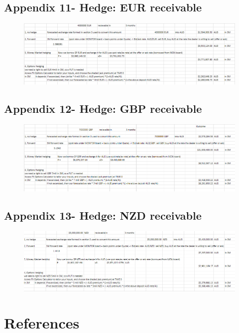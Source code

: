 \documentclass{article}
\let\Oldsubsection\subsection
\renewcommand{\subsection}{\FloatBarrier\Oldsubsection}
\begin{document}
\subsection*{Appendix 11- Hedge: EUR receivable}

\begin{figure}[h!]
    \centering
    \includegraphics[scale=0.5]{hedge/rec-EUR.png}
\end{figure}

\subsection*{Appendix 12- Hedge: GBP receivable}

\begin{figure}[h!]
    \centering
    \includegraphics[scale=0.5]{hedge/rec-GBP.png}
\end{figure}

\subsection*{Appendix 13- Hedge: NZD receivable}

\begin{figure}[h!]
    \centering
    \includegraphics[scale=0.5]{hedge/rec-NZD.png}
\end{figure}

\break

\section*{References}
\end{document}
